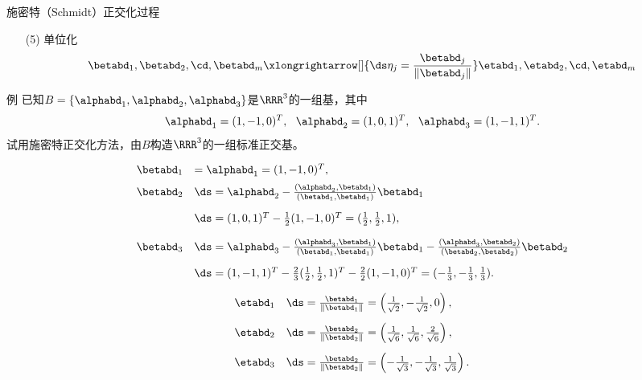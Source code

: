 \begin{frame}
  \begin{footnotesize}
    \begin{block}{施密特（Schmidt）正交化过程}
      \begin{itemize}
      \item[(5)] 单位化
        $$
        \betabd_1, \betabd_2, \cd, \betabd_m \xlongrightarrow[]{\ds \eta_j=\frac{\betabd_j}{\|\betabd_j\|}}
        \etabd_1, \etabd_2, \cd, \etabd_m
        $$
      \end{itemize}
    \end{block}
  \end{footnotesize}
\end{frame}


\begin{frame}
  \begin{footnotesize}
    \begin{exampleblock}{例}
      已知$B=\{\alphabd_1,\alphabd_2,\alphabd_3\}$是$\RRR^3$的一组基，其中
      $$
      \alphabd_1=(1,-1,0)^T,~~
      \alphabd_2=(1,0,1)^T,~~
      \alphabd_3=(1,-1,1)^T.
      $$
      试用施密特正交化方法，由$B$构造$\RRR^3$的一组标准正交基。
    \end{exampleblock}
    \pause\jiename
    $$
    \begin{array}{rl}
      \betabd_1&=\alphabd_1=(1,-1,0)^T, \\[0.2cm]
      \betabd_2&\ds=\alphabd_2-\frac{(\alphabd_2,\betabd_1)}{(\betabd_1,\betabd_1)}\betabd_1\\[0.4cm]
      &\ds=(1,0,1)^T-\frac12(1,-1,0)^T=(\frac12,\frac12,1),\\[0.4cm]
      \betabd_3&\ds=\alphabd_3-\frac{(\alphabd_3,\betabd_1)}{(\betabd_1,\betabd_1)}\betabd_1
      -\frac{(\alphabd_3,\betabd_2)}{(\betabd_2,\betabd_2)}\betabd_2\\[0.4cm]
      &\ds=(1,-1,1)^T-\frac23(\frac12,\frac12,1)^T-\frac22(1,-1,0)^T=(-\frac13,-\frac13,\frac13).
    \end{array}
    $$
  \end{footnotesize}
\end{frame}


\begin{frame}
  \begin{footnotesize}
    $$
    \begin{array}{rl}
      \etabd_1&\ds =\frac{\betabd_1}{\|\betabd_1\|}=\left(\frac1{\sqrt{2}},-\frac1{\sqrt{2}},0\right),\\[0.4cm]
      \etabd_2&\ds =\frac{\betabd_2}{\|\betabd_2\|}=\left(\frac1{\sqrt{6}},\frac1{\sqrt{6}},\frac2{\sqrt{6}}\right),\\[0.4cm]
      \etabd_3&\ds =\frac{\betabd_2}{\|\betabd_2\|}=\left(-\frac1{\sqrt{3}},-\frac1{\sqrt{3}},\frac1{\sqrt{3}}\right).
    \end{array}
    $$
  \end{footnotesize}
\end{frame}

